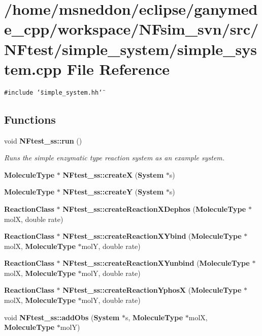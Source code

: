 \section{/home/msneddon/eclipse/ganymede\_\-cpp/workspace/NFsim\_\-svn/src/NFtest/simple\_\-system/simple\_\-system.cpp File Reference}
\label{simple__system_8cpp}


{\tt \#include \char`\"{}simple\_\-system.hh\char`\"{}}\par
\subsection*{Functions}
\begin{CompactItemize}
\item 
void {\bf NFtest\_\-ss::run} ()
\begin{CompactList}\small\item\em Runs the simple enzymatic type reaction system as an example system. \item\end{CompactList}\item 
{\bf MoleculeType} $\ast$ {\bf NFtest\_\-ss::createX} ({\bf System} $\ast$s)
\item 
{\bf MoleculeType} $\ast$ {\bf NFtest\_\-ss::createY} ({\bf System} $\ast$s)
\item 
{\bf ReactionClass} $\ast$ {\bf NFtest\_\-ss::createReactionXDephos} ({\bf MoleculeType} $\ast$molX, double rate)
\item 
{\bf ReactionClass} $\ast$ {\bf NFtest\_\-ss::createReactionXYbind} ({\bf MoleculeType} $\ast$molX, {\bf MoleculeType} $\ast$molY, double rate)
\item 
{\bf ReactionClass} $\ast$ {\bf NFtest\_\-ss::createReactionXYunbind} ({\bf MoleculeType} $\ast$molX, {\bf MoleculeType} $\ast$molY, double rate)
\item 
{\bf ReactionClass} $\ast$ {\bf NFtest\_\-ss::createReactionYphosX} ({\bf MoleculeType} $\ast$molX, {\bf MoleculeType} $\ast$molY, double rate)
\item 
void {\bf NFtest\_\-ss::addObs} ({\bf System} $\ast$s, {\bf MoleculeType} $\ast$molX, {\bf MoleculeType} $\ast$molY)
\end{CompactItemize}
